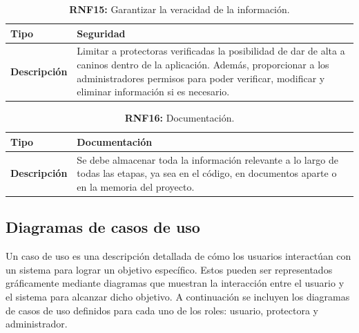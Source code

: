 \documentclass[a4paper, 12pt]{article}
\begin{document}
\begin{table}[H]
\captionsetup{list=no}%
\captionsetup{justification=raggedright,singlelinecheck=false}
\captionsetup{labelformat=empty}
\caption{\textbf{RNF15:} Garantizar la veracidad de la información.}
\label{tab:RNF15}
    \begin{tabular}{|m{5cm}|m{10cm}|}
	    \hline
	    \textbf{Tipo} & Seguridad \\ 
	    \hline
	    \textbf{Descripción} & Limitar a protectoras verificadas la posibilidad de dar de alta a caninos dentro de la aplicación. Además, proporcionar a los administradores permisos para poder verificar, modificar y eliminar información si es necesario. \\ 
	    \hline
    \end{tabular}
\end{table}

\begin{table}[H]
\captionsetup{list=no}%
\captionsetup{justification=raggedright,singlelinecheck=false}
\captionsetup{labelformat=empty}
\caption{\textbf{RNF16:} Documentación.}
\label{tab:RNF16}
    \begin{tabular}{|m{5cm}|m{10cm}|}
	    \hline
	    \textbf{Tipo} & Documentación \\ 
	    \hline
	    \textbf{Descripción} & Se debe almacenar toda la información relevante a lo largo de todas las etapas, ya sea en el código, en documentos aparte o en la memoria del proyecto. \\ 
	    \hline
    \end{tabular}
\end{table}



\subsection{Diagramas de casos de uso}

Un caso de uso es una descripción detallada de cómo los usuarios interactúan con un sistema para lograr un objetivo específico. Estos pueden ser representados gráficamente mediante diagramas que muestran la interacción entre el usuario y el sistema para alcanzar dicho objetivo. A continuación se incluyen los diagramas de casos de uso definidos para cada uno de los roles: usuario, protectora y administrador.
\end{document}
